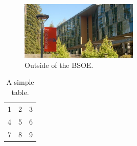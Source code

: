 \documentclass[11pt,oneside,a4paper,onecolumn]{article}                 %
\begin{document}
\begin{figure}[h!] %
  \centering
    \includegraphics[width=0.5\textwidth]{./img/bsoe_outside.png} %
    \caption{Outside of the BSOE.}
\end{figure}

\begin{table}[h!] %
  \begin{center}
    \begin{tabular}{| l c r |}
    \hline
    1 & 2 & 3 \\
    4 & 5 & 6 \\
    7 & 8 & 9 \\
    \hline
    \end{tabular}
  \end{center}
  \caption{A simple table.}
\end{table}


 
\end{document}
